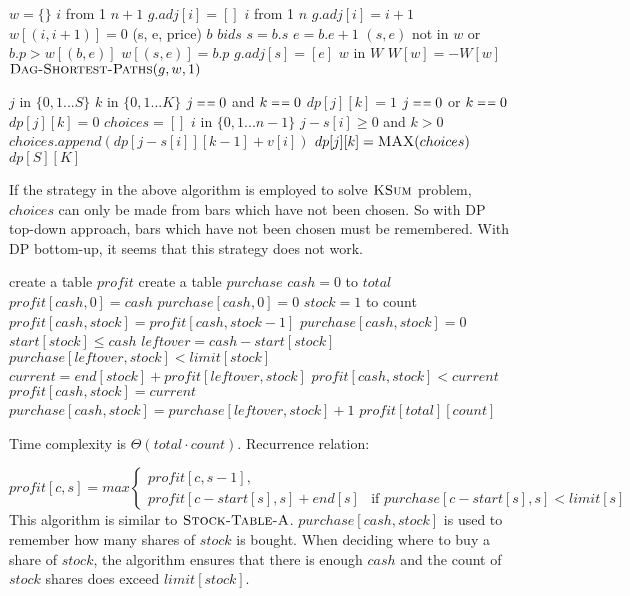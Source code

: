 \documentclass[12pt,twoside]{article}
\begin{document}
\begin{codebox}
\li $w = \{\}$
\li \For $i$ from 1 \To $n+1$
\li \Do $g.adj[i] = []$
\End
\li \For $i$ from 1 \To $n$
\li \Do $g.adj[i] = i+1$
\li $w[(i, i+1)] = 0$
\End
\li \Comment (s, e, price)
\li \For $b$ \In $bids$
\li \Do
$s = b.s$
\li $e = b.e + 1$
\li \If $(s, e)$ not in $w$ or $b.p > w[(b, e)]$
\li \Then $w[(s, e)] = b.p$
\li $g.adj[s] = [e]$
\End \End
\li \For $w$ in $W$
\li \Do $W[w] = -W[w]$
\End
\li $\textnormal{\scshape Dag-Shortest-Paths}(g, w, 1)$
\End
\end{codebox}

\begin{codebox}
\li \For $j$ in $\{0, 1...S\}$
\li \Do \For $k$ in $\{0, 1...K\}$
\li \Do \If $j \isequal 0$ and $k \isequal 0$
\li \Then $dp[j][k] = 1$
\li \ElseIf $j \isequal 0$ or $k \isequal 0$
\li \Then $dp[j][k] = 0$
\li \Else $choices = []$
\li \For $i$ in $\{0, 1...n-1\}$
\Do \li \If $j-s[i] \ge 0$ and $k > 0$
\li \Then $choices.append(dp[j-s[i]][k-1]+v[i])$
\End \li $dp[j][k] = \textnormal{\scshape MAX}(choices)$
\End \End \End
\li \Return $dp[S][K]$
\end{codebox}

If the strategy in the above algorithm is employed to solve $\textnormal{\scshape KSum}$
problem, $choices$ can only be made from bars which have not been chosen. So
with DP top-down approach, bars which have not been chosen must be remembered.
With DP bottom-up, it seems that this strategy does not work.


\begin{codebox}
\li create a table $profit$
\li create a table $purchase$
\li \For $cash = 0$ to $total$
\li \Do $profit[cash, 0] = cash$
\li $purchase[cash, 0] = 0$
\li \For $stock = 1$ to count
\li \Do $profit[cash, stock] = profit[cash, stock-1]$
\li $purchase[cash, stock] = 0$
\li \If $start[stock] \le cash$
\li \Then $leftover = cash - start[stock]$
\li \If $purchase[leftover, stock] < limit[stock]$
\li \Then $current = end[stock] + profit[leftover, stock]$
\li \If $profit[cash, stock] < current$
\li \Then $profit[cash, stock] = current$
\li $purchase[cash, stock] = purchase[leftover, stock] + 1$
\End \End \End \End \End
\li \Return $profit[total][count]$
\end{codebox}

Time complexity is $\Theta(total \cdot count)$. Recurrence relation:

\begin{equation}
profit[c, s] = max
\begin{cases}
profit[c, s-1], \\
profit[c-start[s], s] + end[s] & \text{if } purchase[c-start[s], s] < limit[s]
 \end{cases}
\end{equation}
This algorithm is similar to $\textnormal{\scshape Stock-Table-A}$. $purchase[cash, stock]$ is
used to remember how many shares of $stock$ is bought. When deciding where to
buy a share of $stock$, the algorithm ensures that there is enough $cash$ and
the count of $stock$ shares does exceed $limit[stock]$.
\end{document}
